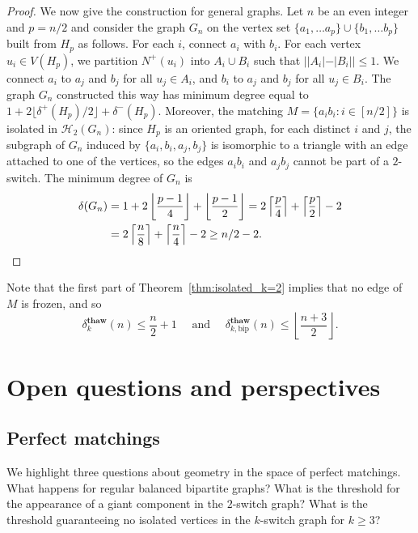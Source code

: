 \documentclass[11pt,a4paper]{article}
\theoremstyle{definition}
\begin{document}
\begin{proof}
  We now give the construction for general graphs. Let $n$ be an even integer and $p = n/2$
  and consider the graph $G_n$ on the vertex set
  $\{a_1, \dots a_{p}\} \cup \{b_1, \dots b_p\}$ built from $H_p$ as
  follows. For each $i$, connect $a_i$ with $b_i$. For each vertex
  $u_i \in V(H_p)$, we partition $N^+(u_i)$ into $A_i \cup B_i$ such that
  $||A_i|- |B_i||\le 1$. We connect $a_i$ to $a_j$ and $b_j$ for all
  $u_j \in A_i$, and $b_i$ to $a_j$ and $b_j$ for all $u_j \in B_i$. The graph
  $G_n$ constructed this way has minimum degree equal to
  $1 + 2\lfloor \delta^+(H_p)/2\rfloor + \delta^-(H_p)$. Moreover, the matching
  $M = \{a_ib_i \colon i \in [n/2]\}$ is isolated in $\mathcal H_2(G_n)$: since $H_p$ is
  an oriented graph, for each distinct $i$ and $j$, the subgraph of $G_n$
  induced by $\{a_i,b_i,a_j,b_j\}$ is isomorphic to a triangle with an edge
  attached to one of the vertices, so the edges $a_ib_i$ and $a_jb_j$ cannot be
  part of a $2$-switch. The minimum degree of $G_n$ is
  \begin{align*}
    \delta(G_n) &= 1 + 2 \left\lfloor \frac{p-1}4 \right \rfloor +  \left\lfloor
                  \frac{p-1}2 \right \rfloor
    = 2\left\lceil \frac{p}4 \right \rceil +  \left\lceil
      \frac{p}2 \right \rceil -2\\
    &= 2\left\lceil \frac{n}8 \right \rceil +  \left\lceil
      \frac{n}4 \right \rceil -2 \ge n/2 -2. \qedhere
  \end{align*}
\end{proof}

Note that the first part of Theorem~\ref{thm:isolated_k=2} implies that no edge of $M$ is frozen, and so 
$$\delta^{\mathbf{thaw}}_k(n) \le \frac{n}2+1 \quad \text{ and } \quad \delta^{\mathbf{thaw}}_{k,\mathrm{bip}}(n) \le \left\lfloor \frac{n+3}2\right\rfloor.$$

\section{Open questions and perspectives}\label{sec:open}

\subsection{Perfect matchings}
We highlight three questions about geometry in the space of perfect matchings.
What happens for regular balanced bipartite graphs? What is the threshold for
the appearance of a giant component in the $2$-switch graph? What is the threshold
guaranteeing no isolated vertices in the $k$-switch graph for $k \ge 3$?
\end{document}
